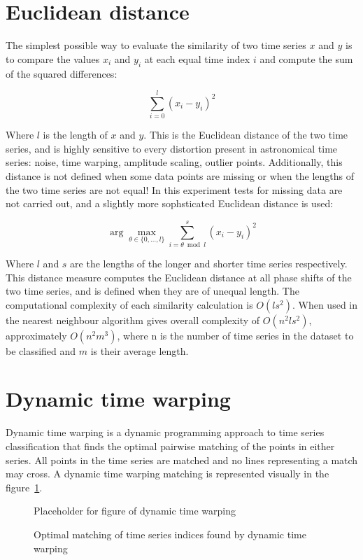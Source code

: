 \documentclass[10pt]{article}
\begin{document}
	\section{Euclidean distance}
		The simplest possible way to evaluate the similarity of two time series $x$ and $y$ is to compare the values $x_{i}$ and $y_{i}$ at each equal time index $i$ and compute the sum of the squared differences:
		
		\begin{equation}
			\sum\limits_{i = 0}^{l}(x_{i} - y_{i})^{2}
		\end{equation}
	
	Where $l$ is the length of $x$ and $y$. This is the Euclidean distance of the two time series, and is highly sensitive to every distortion present in astronomical time series: noise, time warping, amplitude scaling, outlier points. Additionally, this distance is not defined when some data points are missing or when the lengths of the two time series are not equal! In this experiment tests for missing data are not carried out, and a slightly more sophsticated Euclidean distance is used:
	
	\begin{equation}
		\arg\max\limits_{\theta \in \{0, \ldots, l\}}\sum\limits_{i = \theta \bmod l}^{s}(x_{i} - y_{i})^{2}
	\end{equation}
	
	Where $l$ and $s$ are the lengths of the longer and shorter time series respectively. This distance measure computes the Euclidean distance at all phase shifts of the two time series, and is defined when they are of unequal length. The computational complexity of each similarity calculation is $O(ls^{2})$. When used in the nearest neighbour algorithm gives overall complexity of $O(n^{2}ls^{2})$, approximately $O(n^{2}m^{3})$, where n is the number of time series in the dataset to be classified and $m$ is their average length.
	
	\section{Dynamic time warping}
	Dynamic time warping is a dynamic programming approach to time series classification that finds the optimal pairwise matching of the points in either series. All points in the time series are matched and no lines representing a match may cross. A dynamic time warping matching is represented visually in the figure~\ref{fig:dynamictimewarping}. 
	
	\begin{figure}[ht!]
		\label{fig:dynamictimewarping}
		\centering
		Placeholder for figure of dynamic time warping
		\caption{Optimal matching of time series indices found by dynamic time warping}
	\end{figure} 
	
\end{document}
